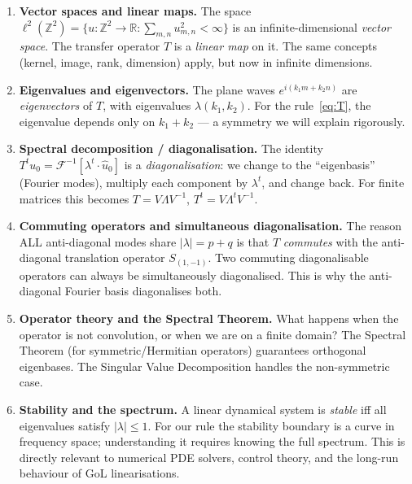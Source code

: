\documentclass[11pt]{article}
\begin{document}
\medskip
\begin{enumerate}[leftmargin=2em, itemsep=4pt]
  \item \textbf{Vector spaces and linear maps.}
    The space $\ell^2(\mathbb{Z}^2) = \{u:\mathbb{Z}^2\to\mathbb{R} :
    \sum_{m,n}u_{m,n}^2 < \infty\}$ is an infinite-dimensional
    \emph{vector space}.  The transfer operator $T$ is a \emph{linear map}
    on it.  The same concepts (kernel, image, rank, dimension) apply,
    but now in infinite dimensions.

  \item \textbf{Eigenvalues and eigenvectors.}
    The plane waves $e^{i(k_1 m + k_2 n)}$ are
    \emph{eigenvectors} of $T$, with eigenvalues $\lambda(k_1,k_2)$.
    For the rule~\eqref{eq:T}, the eigenvalue depends only on $k_1+k_2$
    --- a symmetry we will explain rigorously.

  \item \textbf{Spectral decomposition / diagonalisation.}
    The identity $T^t u_0 = \mathcal{F}^{-1}[\lambda^t \cdot \hat u_0]$
    is a \emph{diagonalisation}: we change to the ``eigenbasis''
    (Fourier modes), multiply each component by $\lambda^t$, and change
    back.  For finite matrices this becomes $T = V \Lambda V^{-1}$,
    $T^t = V \Lambda^t V^{-1}$.

  \item \textbf{Commuting operators and simultaneous diagonalisation.}
    The reason ALL anti-diagonal modes share $|\lambda|=p+q$ is that
    $T$ \emph{commutes} with the anti-diagonal translation operator
    $S_{(1,-1)}$.  Two commuting diagonalisable operators can always be
    simultaneously diagonalised.  This is why the
    anti-diagonal Fourier basis diagonalises both.

  \item \textbf{Operator theory and the Spectral Theorem.}
    What happens when the operator is not convolution, or when we are
    on a finite domain?  The Spectral Theorem (for symmetric/Hermitian
    operators) guarantees orthogonal eigenbases.  The
    Singular Value Decomposition handles the non-symmetric case.

  \item \textbf{Stability and the spectrum.}
    A linear dynamical system is \emph{stable} iff all eigenvalues
    satisfy $|\lambda|\le 1$.  For our rule the stability boundary is a
    curve in frequency space; understanding it requires knowing the full
    spectrum.  This is directly relevant to numerical PDE solvers,
    control theory, and the long-run behaviour of GoL linearisations.
\end{enumerate}
\end{document}
